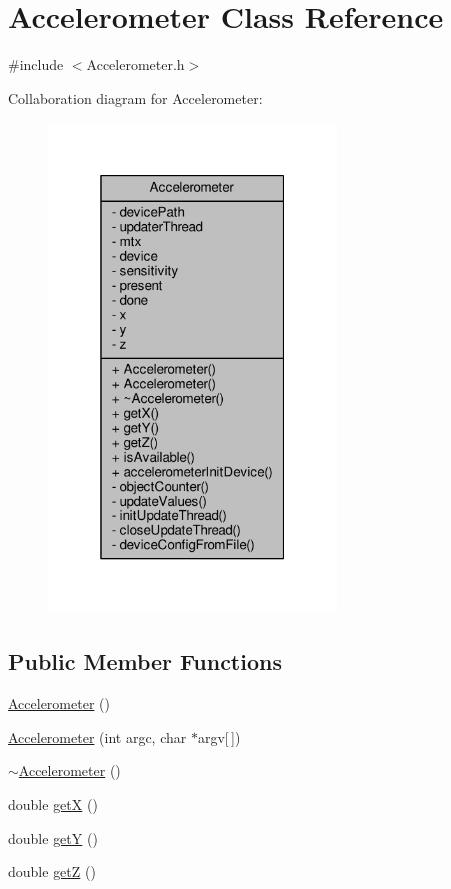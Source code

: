 \hypertarget{classAccelerometer}{}\section{Accelerometer Class Reference}
\label{classAccelerometer}


{\ttfamily \#include $<$Accelerometer.\+h$>$}



Collaboration diagram for Accelerometer\+:\nopagebreak
\begin{figure}[H]
\begin{center}
\leavevmode
\includegraphics[width=217pt]{classAccelerometer__coll__graph}
\end{center}
\end{figure}
\subsection*{Public Member Functions}
\begin{DoxyCompactItemize}
\item 
\hyperlink{classAccelerometer_aa01d756f8ba70acaaab7938dff643d4d}{Accelerometer} ()
\item 
\hyperlink{classAccelerometer_ac5ae04cdfd2ad1e500fd5cd4c1d10a19}{Accelerometer} (int argc, char $\ast$argv\mbox{[}$\,$\mbox{]})
\item 
\hyperlink{classAccelerometer_acb6a7d9c61f2084ec4aec4a8ff35d622}{$\sim$\+Accelerometer} ()
\item 
double \hyperlink{classAccelerometer_a9c6ac96d56c678b523216b690ff05723}{get\+X} ()
\item 
double \hyperlink{classAccelerometer_ac66896e76f13e8395203a142125f792b}{get\+Y} ()
\item 
double \hyperlink{classAccelerometer_ac35787c41e79c66c25b2c6bde034af87}{get\+Z} ()
\end{DoxyCompactItemize}
